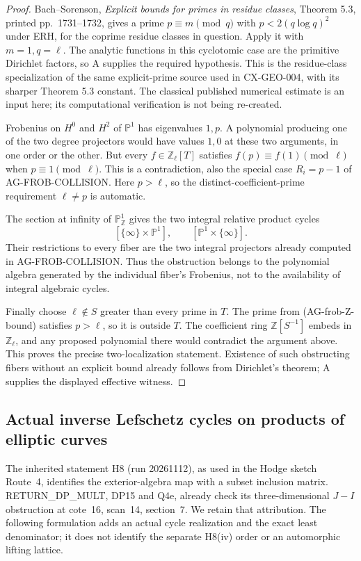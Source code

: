 \begin{proof}
Bach--Sorenson, \emph{Explicit bounds for primes in
residue classes}, Theorem 5.3, printed pp.~1731--1732,
gives a prime $p\equiv m\pmod q$ with
$p<2(q\log q)^2$ under ERH, for the coprime residue
classes in question.  Apply it with $m=1,q=\ell$.
The analytic functions in this cyclotomic case are
the primitive Dirichlet factors, so A supplies the
required hypothesis.  This is the residue-class
specialization of the same explicit-prime source
used in CX-GEO-004, with its sharper Theorem 5.3
constant.  The classical published numerical
estimate is an input here; its computational
verification is not being re-created.

Frobenius on $H^0$ and $H^2$ of $\mathbb P^1$ has
eigenvalues $1,p$.  A polynomial producing one of
the two degree projectors would have values $1,0$
at these two arguments, in one order or the other.
But every $f\in\mathbb Z_\ell[T]$ satisfies
$f(p)\equiv f(1)\pmod\ell$ when $p\equiv1\pmod\ell$.
This is a contradiction, also the special case
$R_i=p-1$ of AG-FROB-COLLISION.  Here $p>\ell$,
so the distinct-coefficient-prime requirement
$\ell\ne p$ is automatic.

The section at infinity of $\mathbb P^1_{\mathbb Z}$
gives the two integral relative product cycles
\[
 [\{\infty\}\times\mathbb P^1],\qquad
 [\mathbb P^1\times\{\infty\}].
\]
Their restrictions to every fiber are the two
integral projectors already computed in
AG-FROB-COLLISION.  Thus the obstruction belongs
to the polynomial algebra generated by the
individual fiber's Frobenius, not to the availability
of integral algebraic cycles.

Finally choose $\ell\notin S$ greater than every
prime in $T$.  The prime from (AG-frob-Z-bound)
satisfies $p>\ell$, so it is outside $T$.
The coefficient ring $\mathbb Z[S^{-1}]$ embeds
in $\mathbb Z_\ell$, and any proposed polynomial
there would contradict the argument above.
This proves the precise two-localization statement.
Existence of such obstructing fibers without an
explicit bound already follows from Dirichlet's
theorem; A supplies the displayed effective witness.
\end{proof}


\subsection{Actual inverse Lefschetz cycles on products of elliptic curves}
\label{ag:lefschetz-geometric}

The inherited statement H8 (run 20261112), as used in the Hodge
sketch Route~4, identifies the exterior-algebra map with a subset
inclusion matrix.  RETURN\_DP\_MULT, DP15 and Q4e, already check
its three-dimensional $J-I$ obstruction at cote~16, scan~14,
section~7.  We retain that attribution.  The following formulation
adds an actual cycle realization and the exact least denominator;
it does not identify the separate H8(iv) order or an automorphic
lifting lattice.

